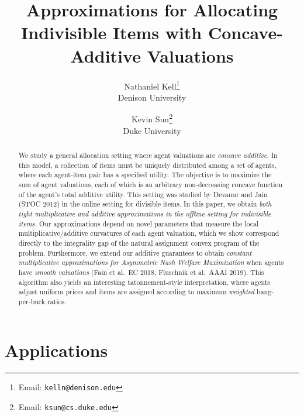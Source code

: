 \documentclass[11pt,letterpaper]{article}
\title{Approximations for Allocating Indivisible Items with Concave-Additive Valuations}
\author{
Nathaniel Kell\thanks{Email: {\tt kelln@denison.edu}}\\Denison University
\and
Kevin Sun\thanks{Email: {\tt ksun@cs.duke.edu}}\\Duke University
}
\begin{document}
\maketitle
\begin{abstract} 
We study a general allocation setting where agent valuations are {\em concave additive}. In this model, a collection of items must  be uniquely distributed among a set of agents, where each agent-item pair has a specified utility. The objective is to maximize the sum of agent valuations, each of which is an arbitrary non-decreasing concave function of the agent's total additive utility.  This setting was studied by Devanur and Jain (STOC 2012) in the online setting for divisible items. In this paper, 
we obtain {\em both  tight multiplicative and additive approximations in the offline setting for  indivisible items.}
Our approximations depend on novel parameters that measure the local multiplicative/additive curvatures of each agent valuation, which we show correspond directly to the integrality gap of the natural assignment convex program of the problem. Furthermore, we extend our additive guarantees to obtain {\em constant multiplicative approximations for Asymmetric Nash Welfare Maximization} when agents have  {\em smooth valuations} (Fain et al.\ EC 2018, Fluschnik et al.\ AAAI 2019). This algorithm also yields an interesting tatonnement-style interpretation,  where agents adjust uniform prices and items are assigned according to maximum {\em weighted} bang-per-buck ratios.
\end{abstract}





\section{Applications}
\label{sec:apps}







\end{document}
